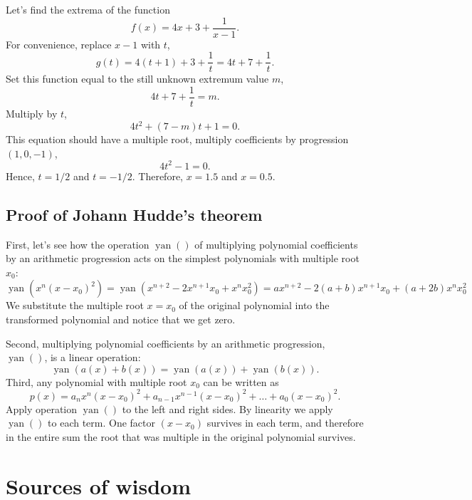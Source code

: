 \documentclass[12pt]{article}
\DeclareMathOperator{\yan}{yan}
\begin{document}
Let's find the extrema of the function 
\[
f(x) = 4x + 3 + \frac{1}{x - 1}.
\]
For convenience, replace $x - 1$ with $t$,
\[
g(t) = 4(t + 1) + 3 + \frac{1}{t} = 4t + 7 + \frac{1}{t}.
\]
Set this function equal to the still unknown extremum value $m$,
\[
4t + 7 + \frac{1}{t} = m.
\]
Multiply by $t$, 
\[
4t^2 + (7 - m) t + 1 = 0.
\]
This equation should have a multiple root, multiply coefficients by progression $(1, 0, -1)$,
\[
4t^2 - 1 = 0.
\]
Hence, $t = 1/2$ and $t = -1/2$.
Therefore, $x = 1.5$ and $x = 0.5$.


\subsection*{Proof of Johann Hudde's theorem}

First, let's see how the operation $\yan()$ of multiplying polynomial coefficients by an arithmetic progression 
acts on the simplest polynomials with multiple root $x_0$:
\[
\yan(x^n(x - x_0)^2) = \yan(x^{n+2} - 2x^{n+1} x_0 + x^n x_0^2) = ax^{n+2} - 2(a + b)x^{n+1} x_0 + (a+2b)x^n x_0^2
\]
We substitute the multiple root $x = x_0$ of the original polynomial into the transformed polynomial and notice that we get zero. 

Second, multiplying polynomial coefficients by an arithmetic progression, $\yan()$, is a linear operation:
\[
\yan(a(x) + b(x)) = \yan(a(x)) + \yan(b(x)).
\]
Third, any polynomial with multiple root $x_0$ can be written as
\[
p(x) = a_n x^n (x - x_0)^2 + a_{n-1} x^{n-1}(x - x_0)^2 + \dots + a_0 (x - x_0)^2.
\]
Apply operation $\yan()$ to the left and right sides. 
By linearity we apply $\yan()$ to each term.
One factor $(x - x_0)$ survives in each term, and therefore in the entire sum the root that was multiple in the original polynomial survives.


\section*{Sources of wisdom}
\printbibliography[heading=none]
\end{document}
